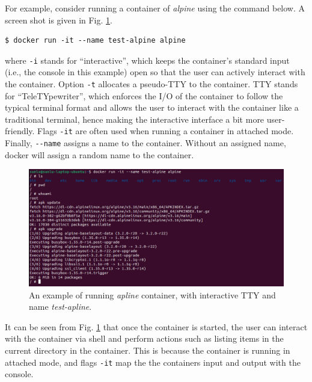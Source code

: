 For example, consider running a container of \textit{alpine} using the command below. A screen shot is given in Fig. \ref{ch:vac:fig:dockerrunexp}.
\begin{lstlisting}
$ docker run -it --name test-alpine alpine
\end{lstlisting}
where \verb|-i| stands for ``interactive'', which keeps the container's standard input (i.e., the console in this example) open so that the user can actively interact with the container. Option \verb|-t| allocates a pseudo-TTY to the container. TTY stands for ``TeleTYpewriter'', which enforces the I/O of the container to follow the typical terminal format and allows the user to interact with the container like a traditional terminal, hence making the interactive interface a bit more user-friendly. Flags \verb|-it| are often used when running a container in attached mode. Finally, \verb|--name| assigns a name to the container. Without an assigned name, docker will assign a random name to the container.
\begin{figure}[!htb]
	\centering
	\includegraphics[width=350pt]{chapters/part-3/figures/dockerrunexp.png}
	\caption{An example of running \textit{apline} container, with interactive TTY and name \textit{test-apline}.} \label{ch:vac:fig:dockerrunexp}
\end{figure}

It can be seen from Fig. \ref{ch:vac:fig:dockerrunexp} that once the container is started, the user can interact with the container via shell and perform actions such as listing items in the current directory in the container. This is because the container is running in attached mode, and flags \verb|-it| map the the containers input and output with the console.

